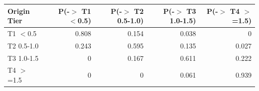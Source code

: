 \begin{tabular}{lrrrr}
\toprule
 Origin Tier   &   P(-\ensuremath{>} T1 \ensuremath{<}0.5) &   P(-\ensuremath{>} T2 0.5-1.0) &   P(-\ensuremath{>} T3 1.0-1.5) &   P(-\ensuremath{>} T4 \ensuremath{>}=1.5) \\
\midrule
 T1 \ensuremath{<}0.5       &           0.808 &              0.154 &              0.038 &            0     \\
 T2 0.5-1.0    &           0.243 &              0.595 &              0.135 &            0.027 \\
 T3 1.0-1.5    &           0     &              0.167 &              0.611 &            0.222 \\
 T4 \ensuremath{>}=1.5      &           0     &              0     &              0.061 &            0.939 \\
\bottomrule
\end{tabular}